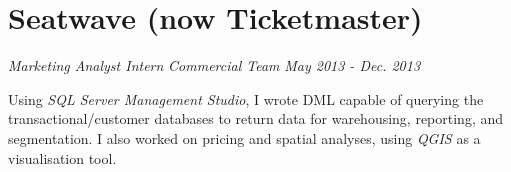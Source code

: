 \documentclass[letterpaper,11pt]{article}
\begin{document}
\section{Seatwave (now Ticketmaster)}
\textit{Marketing Analyst Intern}
\hfill
\textit{Commercial Team}
\hfill
\textit{May 2013 - Dec. 2013\\}

\noindent
Using \textit{SQL Server Management Studio}, I wrote DML capable of querying the transactional/customer databases to return data for warehousing, reporting, and segmentation. I also worked on pricing and spatial analyses, using \textit{QGIS} as a visualisation tool.
\end{document}
